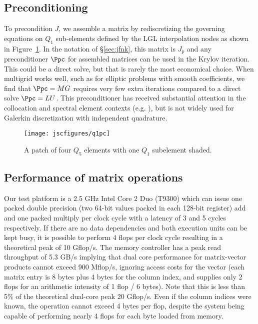 \subsection{Preconditioning}\label{sec:preconditioning}
To precondition $J$, we assemble a matrix by rediscretizing the governing equations on $Q_1$ sub-elements defined by the
LGL interpolation nodes as shown in Figure~\ref{fig:q1pc}.  In the notation of \S\ref{sec:jfnk}, this matrix is $J_p$
and any preconditioner $\Ppc$ for assembled matrices can be used in the Krylov iteration.  This could be a direct solve,
but that is rarely the most economical choice.  When multigrid works well, such as for elliptic problems with smooth
coefficients, we find that $\Ppc = MG$ requires very few extra iterations compared to a direct solve $\Ppc = LU$.  This
preconditioner has received substantial attention in the collocation and spectral element contexts
(e.g. \cite{orszag1980smp,deville1985cps,deville1990fep,heys2005amh,kim2007pbp}), but is not widely used for Galerkin
discretization with independent quadrature.

\begin{figure}
  \centering\texttt{[image: jscfigures/q1pc]}
  \caption{A patch of four $Q_5$ elements with one $Q_1$ subelement shaded.}\label{fig:q1pc}
\end{figure}

\subsection{Performance of matrix operations}\label{sec:mat-perf}
Our test platform is a 2.5 GHz Intel Core 2 Duo (T9300) which can issue one packed double precision (two 64-bit values
packed in each 128-bit register) add and one packed multiply per clock cycle with a latency of 3 and 5 cycles
respectively.  If there are no data dependencies and both execution units can be kept busy, it is possible to perform 4
flops per clock cycle resulting in a theoretical peak of 10 Gflop/s.  The memory controller has a peak read throughput
of 5.3 GB/s implying that dual core performance for matrix-vector products cannot exceed 900 Mflop/s, ignoring access
costs for the vector (each matrix entry is 8 bytes plus 4 bytes for the column index, and supplies only 2 flops for an
arithmetic intensity of 1 flop / 6 bytes).  Note that this is less than 5\% of the theoretical dual-core peak 20
Gflop/s.  Even if the column indices were known, the operation cannot exceed 4 bytes per flop, despite the system being
capable of performing nearly 4 flops for each byte loaded from memory.

